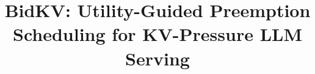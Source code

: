 \documentclass[conference]{IEEEtran}
\begin{document}
\title{BidKV: Utility-Guided Preemption Scheduling for KV-Pressure LLM Serving
}


\maketitle
\end{document}
